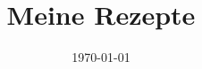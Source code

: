 \documentclass[11pt,a4paper,oneside]{scrartcl}
\begin{document}
\title{Meine Rezepte}
\author{}
\date{\today}
\maketitle

\tableofcontents
\clearpage


\end{document}
